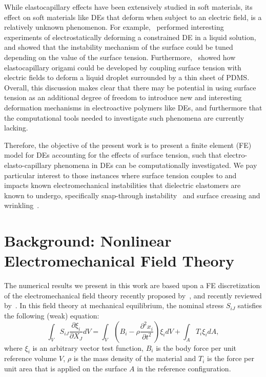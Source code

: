 \documentclass[8.5pt,twoside,twocolumn]{article}
\begin{document}
While elastocapillary effects have been extensively studied in soft materials, its effect on soft materials like DEs that deform when subject to an electric field, is a relatively unknown phenomenon.  For example,~\citet{wangPRE2013} performed interesting experiments of electrostatically deforming a constrained DE in a liquid solution, and showed that the instability mechanism of the surface could be tuned depending on the value of the surface tension.  Furthermore,~\citet{pineiruaSM2010} showed how elastocapillary origami could be developed by coupling surface tension with electric fields to deform a liquid droplet surrounded by a thin sheet of PDMS.  Overall, this discussion makes clear that there may be potential in using surface tension as an additional degree of freedom to introduce new and interesting deformation mechanisms in electroactive polymers like DEs, and furthermore that the computational tools needed to investigate such phenomena are currently lacking.  

Therefore, the objective of the present work is to present a finite element (FE) model for DEs accounting for the effects of surface tension, such that electro-elasto-capillary phenomena in DEs can be computationally investigated.  We pay particular interest to those instances where surface tension couples to and impacts known electromechanical instabilities that dielectric elastomers are known to undergo, specifically snap-through instability~\citep{pelrineSCIENCE2000} and surface creasing and wrinkling~\citep{wangPRL2011,wangAM2012,wangPRE2013}.

\section{Background: Nonlinear Electromechanical Field Theory}

The numerical results we present in this work are based upon a FE discretization of the electromechanical field theory recently proposed by~\citet{suoJMPS2008}, and recently reviewed by~\citet{suoAMSS2010}.   In this field theory at mechanical equilibrium, the nominal stress $S_{iJ}$ satisfies the following (weak) equation:
\begin{equation}\label{eq:suo1} \int_{V}S_{iJ}\frac{\partial\xi_{i}}{\partial X_{J}}dV=\int_{V}\left(B_{i}-\rho\frac{\partial^{2}x_{i}}{\partial t^{2}}\right)\xi_{i}dV+\int_{A}T_{i}\xi_{i}dA,
\end{equation}
where $\xi_{i}$ is an arbitrary vector test function, $B_{i}$ is the body force per unit reference volume $V$, $\rho$ is the mass density of the material and $T_{i}$ is the force per unit area that is applied on the surface $A$ in the reference configuration.  
\end{document}
